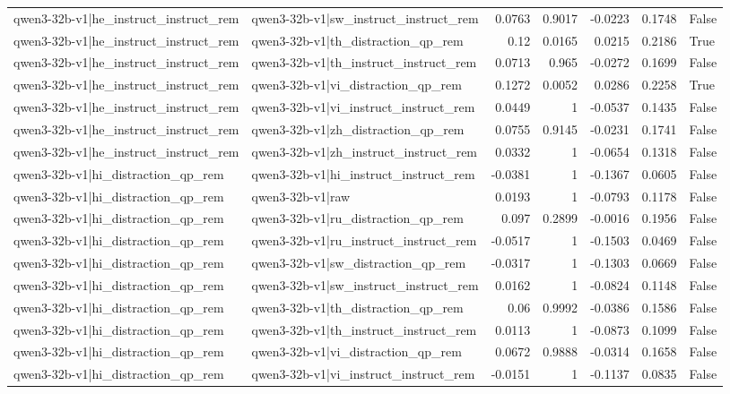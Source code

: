 \begin{table}
\begin{tabular}{l l r r r r l}
qwen3-32b-v1|he_instruct_instruct_rem & qwen3-32b-v1|sw_instruct_instruct_rem & 0.0763 & 0.9017 & -0.0223 & 0.1748 & False \\
qwen3-32b-v1|he_instruct_instruct_rem & qwen3-32b-v1|th_distraction_qp_rem & 0.12 & 0.0165 & 0.0215 & 0.2186 & True \\
qwen3-32b-v1|he_instruct_instruct_rem & qwen3-32b-v1|th_instruct_instruct_rem & 0.0713 & 0.965 & -0.0272 & 0.1699 & False \\
qwen3-32b-v1|he_instruct_instruct_rem & qwen3-32b-v1|vi_distraction_qp_rem & 0.1272 & 0.0052 & 0.0286 & 0.2258 & True \\
qwen3-32b-v1|he_instruct_instruct_rem & qwen3-32b-v1|vi_instruct_instruct_rem & 0.0449 & 1 & -0.0537 & 0.1435 & False \\
qwen3-32b-v1|he_instruct_instruct_rem & qwen3-32b-v1|zh_distraction_qp_rem & 0.0755 & 0.9145 & -0.0231 & 0.1741 & False \\
qwen3-32b-v1|he_instruct_instruct_rem & qwen3-32b-v1|zh_instruct_instruct_rem & 0.0332 & 1 & -0.0654 & 0.1318 & False \\
qwen3-32b-v1|hi_distraction_qp_rem & qwen3-32b-v1|hi_instruct_instruct_rem & -0.0381 & 1 & -0.1367 & 0.0605 & False \\
qwen3-32b-v1|hi_distraction_qp_rem & qwen3-32b-v1|raw & 0.0193 & 1 & -0.0793 & 0.1178 & False \\
qwen3-32b-v1|hi_distraction_qp_rem & qwen3-32b-v1|ru_distraction_qp_rem & 0.097 & 0.2899 & -0.0016 & 0.1956 & False \\
qwen3-32b-v1|hi_distraction_qp_rem & qwen3-32b-v1|ru_instruct_instruct_rem & -0.0517 & 1 & -0.1503 & 0.0469 & False \\
qwen3-32b-v1|hi_distraction_qp_rem & qwen3-32b-v1|sw_distraction_qp_rem & -0.0317 & 1 & -0.1303 & 0.0669 & False \\
qwen3-32b-v1|hi_distraction_qp_rem & qwen3-32b-v1|sw_instruct_instruct_rem & 0.0162 & 1 & -0.0824 & 0.1148 & False \\
qwen3-32b-v1|hi_distraction_qp_rem & qwen3-32b-v1|th_distraction_qp_rem & 0.06 & 0.9992 & -0.0386 & 0.1586 & False \\
qwen3-32b-v1|hi_distraction_qp_rem & qwen3-32b-v1|th_instruct_instruct_rem & 0.0113 & 1 & -0.0873 & 0.1099 & False \\
qwen3-32b-v1|hi_distraction_qp_rem & qwen3-32b-v1|vi_distraction_qp_rem & 0.0672 & 0.9888 & -0.0314 & 0.1658 & False \\
qwen3-32b-v1|hi_distraction_qp_rem & qwen3-32b-v1|vi_instruct_instruct_rem & -0.0151 & 1 & -0.1137 & 0.0835 & False \\

\end{tabular}
\end{table}
